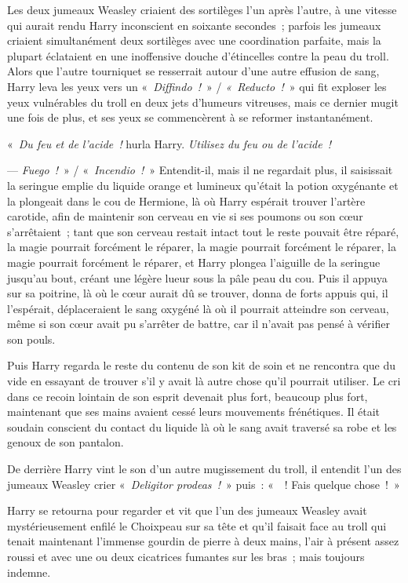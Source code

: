 Les deux jumeaux Weasley criaient des sortilèges l'un après l'autre, à une vitesse qui aurait rendu Harry inconscient en soixante secondes~; parfois les jumeaux criaient simultanément deux sortilèges avec une coordination parfaite, mais la plupart éclataient en une inoffensive douche d'étincelles contre la peau du troll. Alors que l'autre tourniquet se resserrait autour d'une autre effusion de sang, Harry leva les yeux vers un «~\emph{Diffindo~!}~» / \emph{«~Reducto~!}~» qui fit exploser les yeux vulnérables du troll en deux jets d'humeurs vitreuses, mais ce dernier mugit une fois de plus, et ses yeux se commencèrent à se reformer instantanément.

«~\emph{Du feu et de l'acide~!} hurla Harry. \emph{Utilisez du feu ou de l'acide~!}

--- \emph{Fuego~!}~» / «~\emph{Incendio~!}~» Entendit-il, mais il ne regardait plus, il saisissait la seringue emplie du liquide orange et lumineux qu'était la potion oxygénante et la plongeait dans le cou de Hermione, là où Harry espérait trouver l'artère carotide, afin de maintenir son cerveau en vie si ses poumons ou son cœur s'arrêtaient~; tant que son cerveau restait intact tout le reste pouvait être réparé, la magie pourrait forcément le réparer, la magie pourrait forcément le réparer, la magie pourrait forcément le réparer, et Harry plongea l'aiguille de la seringue jusqu'au bout, créant une légère lueur sous la pâle peau du cou. Puis il appuya sur sa poitrine, là où le cœur aurait dû se trouver, donna de forts appuis qui, il l'espérait, déplaceraient le sang oxygéné là où il pourrait atteindre son cerveau, même si son cœur avait pu s'arrêter de battre, car il n'avait pas pensé à vérifier son pouls.

Puis Harry regarda le reste du contenu de son kit de soin et ne rencontra que du vide en essayant de trouver s'il y avait là autre chose qu'il pourrait utiliser. Le cri dans ce recoin lointain de son esprit devenait plus fort, beaucoup plus fort, maintenant que ses mains avaient cessé leurs mouvements frénétiques. Il était soudain conscient du contact du liquide là où le sang avait traversé sa robe et les genoux de son pantalon.

De derrière Harry vint le son d'un autre mugissement du troll, il entendit l'un des jumeaux Weasley crier «~\emph{Deligitor prodeas~!}~» puis~: «~~! Fais quelque chose~!~»

Harry se retourna pour regarder et vit que l'un des jumeaux Weasley avait mystérieusement enfilé le Choixpeau sur sa tête et qu'il faisait face au troll qui tenait maintenant l'immense gourdin de pierre à deux mains, l'air à présent assez roussi et avec une ou deux cicatrices fumantes sur les bras~; mais toujours indemne.

